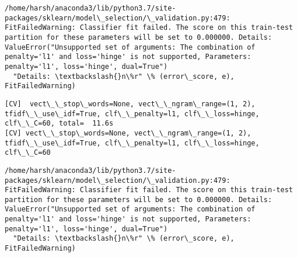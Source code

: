 \documentclass[11pt]{article}
\begin{document}
    \begin{Verbatim}[commandchars=\\\{\}]
/home/harsh/anaconda3/lib/python3.7/site-packages/sklearn/model\_selection/\_validation.py:479: FitFailedWarning: Classifier fit failed. The score on this train-test partition for these parameters will be set to 0.000000. Details: 
ValueError("Unsupported set of arguments: The combination of penalty='l1' and loss='hinge' is not supported, Parameters: penalty='l1', loss='hinge', dual=True")
  "Details: \textbackslash{}n\%r" \% (error\_score, e), FitFailedWarning)

    \end{Verbatim}

    \begin{Verbatim}[commandchars=\\\{\}]
[CV]  vect\_\_stop\_words=None, vect\_\_ngram\_range=(1, 2), tfidf\_\_use\_idf=True, clf\_\_penalty=l1, clf\_\_loss=hinge, clf\_\_C=60, total=  11.6s
[CV] vect\_\_stop\_words=None, vect\_\_ngram\_range=(1, 2), tfidf\_\_use\_idf=True, clf\_\_penalty=l1, clf\_\_loss=hinge, clf\_\_C=60 

    \end{Verbatim}

    \begin{Verbatim}[commandchars=\\\{\}]
/home/harsh/anaconda3/lib/python3.7/site-packages/sklearn/model\_selection/\_validation.py:479: FitFailedWarning: Classifier fit failed. The score on this train-test partition for these parameters will be set to 0.000000. Details: 
ValueError("Unsupported set of arguments: The combination of penalty='l1' and loss='hinge' is not supported, Parameters: penalty='l1', loss='hinge', dual=True")
  "Details: \textbackslash{}n\%r" \% (error\_score, e), FitFailedWarning)

    \end{Verbatim}
\end{document}
